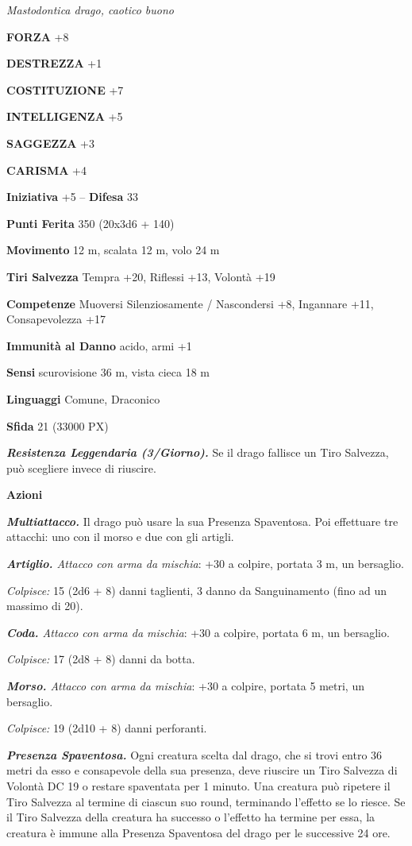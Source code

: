 \begin{multicols}{2}
\textit{Mastodontica drago, caotico buono}

\textbf{FORZA} +8

\textbf{DESTREZZA} +1

\textbf{COSTITUZIONE} +7

\textbf{INTELLIGENZA} +5

\textbf{SAGGEZZA} +3

\textbf{CARISMA} +4

\textbf{Iniziativa} +5 -- \textbf{Difesa} 33

\textbf{Punti Ferita} 350 (20x3d6 + 140)

\textbf{Movimento} 12 m, scalata 12 m, volo 24 m

\textbf{Tiri Salvezza} Tempra +20, Riflessi +13, Volontà +19

\textbf{Competenze} Muoversi Silenziosamente / Nascondersi +8, Ingannare +11, Consapevolezza +17

\textbf{Immunità al Danno} acido, armi +1

\textbf{Sensi} scurovisione 36 m, vista cieca 18 m

\textbf{Linguaggi} Comune, Draconico

\textbf{Sfida} 21 (33000 PX)

\textit{\textbf{Resistenza Leggendaria (3/Giorno).}} Se il drago fallisce un Tiro Salvezza, può scegliere invece di riuscire.

\textbf{Azioni}

\textit{\textbf{Multiattacco.}} Il drago può usare la sua Presenza Spaventosa. Poi effettuare tre attacchi: uno con il morso e due con gli artigli.

\textit{\textbf{Artiglio.} Attacco con arma da mischia}: +30 a colpire, portata 3 m, un bersaglio.

\textit{Colpisce:} 15 (2d6 + 8) danni taglienti, 3 danno da Sanguinamento (fino ad un massimo di 20).

\textit{\textbf{Coda.} Attacco con arma da mischia}: +30 a colpire, portata 6 m, un bersaglio.

\textit{Colpisce:} 17 (2d8 + 8) danni da botta.

\textit{\textbf{Morso.} Attacco con arma da mischia}: +30 a colpire, portata 5 metri, un bersaglio.

\textit{Colpisce:} 19 (2d10 + 8) danni perforanti.

\textit{\textbf{Presenza Spaventosa.}} Ogni creatura scelta dal drago, che si trovi entro 36 metri da esso e consapevole della sua presenza, deve riuscire un Tiro Salvezza di Volontà DC 19 o restare spaventata per 1 minuto. Una creatura può ripetere il Tiro Salvezza al termine di ciascun suo round, terminando l'effetto se lo riesce. Se il Tiro Salvezza della creatura ha successo o l'effetto ha termine per essa, la creatura è immune alla Presenza Spaventosa del drago per le successive 24 ore.


\end{multicols}
